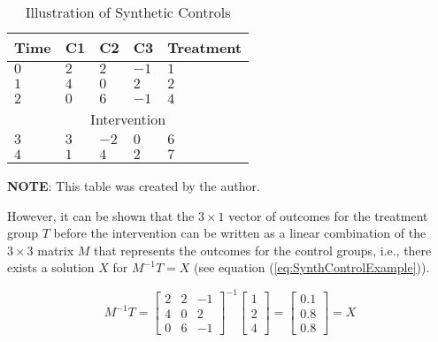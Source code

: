\documentclass[12pt]{article}
\begin{document}
\begin{table}
  \caption{Illustration of Synthetic Controls}
  \begin{center}
      \begin{threeparttable}
        \begin{tabularx}{\textwidth}{|X|p{2.5cm}|p{2.5cm}|p{2.5cm}|p{2.5cm}|}
          \hline
          Time & C1 & C2 & C3 & Treatment \\ \hline
          $0$ & $2$ & $2$  & $-1$ & $1$ \\ \hline
          $1$ & $4$ & $0$  & $ 2$ & $2$ \\ \hline
          $2$ & $0$ & $6$  & $-1$ & $4$ \\ \hline
          \multicolumn{5}{|c|}{Intervention} \\ \hline
          $3$ & $3$ & $-2$ & $ 0$ & $6$ \\ \hline
          $4$ & $1$ & $4$  & $ 2$ & $7$ \\ \hline
      \end{tabularx}
      \begin{tablenotes}
        \footnotesize
        \textbf{NOTE}: This table was created by the author.
      \end{tablenotes}
    \end{threeparttable}
  \end{center}
\label{tab:SimpleSynthControls}
\end{table}

However, it can be shown that the $3 \times 1$ vector of outcomes for the treatment group $T$ before the intervention can be written as a linear combination of the $3 \times 3$ matrix $M$ that represents the outcomes for the control groups, i.e., there exists a solution $X$ for $M^{-1}T = X$ (see equation (\ref{eq:SynthControlExample})).

\begin{equation}\label{eq:SynthControlExample}
 M^{-1}T =
 \begin{bmatrix} 2 & 2 & -1 \\ 4 & 0 & 2 \\ 0 & 6 & -1 \end{bmatrix}^{-1}
 \begin{bmatrix} 1 \\ 2 \\ 4 \end{bmatrix}
 =
 \begin{bmatrix} 0.1 \\ 0.8 \\ 0.8 \end{bmatrix}
 =
 X
\end{equation}
\end{document}
